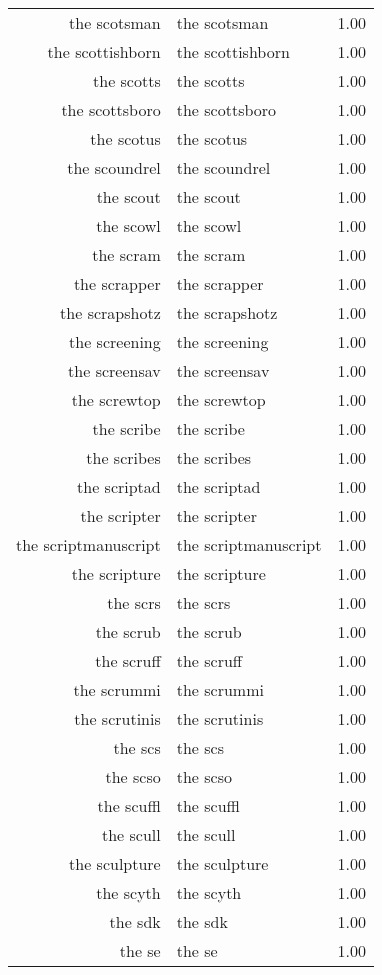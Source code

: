 \begin{table}[ht]
\begin{tabular}{rlr}
  the scotsman & the scotsman & 1.00 \\ 
  the scottishborn & the scottishborn & 1.00 \\ 
  the scotts & the scotts & 1.00 \\ 
  the scottsboro & the scottsboro & 1.00 \\ 
  the scotus & the scotus & 1.00 \\ 
  the scoundrel & the scoundrel & 1.00 \\ 
  the scout & the scout & 1.00 \\ 
  the scowl & the scowl & 1.00 \\ 
  the scram & the scram & 1.00 \\ 
  the scrapper & the scrapper & 1.00 \\ 
  the scrapshotz & the scrapshotz & 1.00 \\ 
  the screening & the screening & 1.00 \\ 
  the screensav & the screensav & 1.00 \\ 
  the screwtop & the screwtop & 1.00 \\ 
  the scribe & the scribe & 1.00 \\ 
  the scribes & the scribes & 1.00 \\ 
  the scriptad & the scriptad & 1.00 \\ 
  the scripter & the scripter & 1.00 \\ 
  the scriptmanuscript & the scriptmanuscript & 1.00 \\ 
  the scripture & the scripture & 1.00 \\ 
  the scrs & the scrs & 1.00 \\ 
  the scrub & the scrub & 1.00 \\ 
  the scruff & the scruff & 1.00 \\ 
  the scrummi & the scrummi & 1.00 \\ 
  the scrutinis & the scrutinis & 1.00 \\ 
  the scs & the scs & 1.00 \\ 
  the scso & the scso & 1.00 \\ 
  the scuffl & the scuffl & 1.00 \\ 
  the scull & the scull & 1.00 \\ 
  the sculpture & the sculpture & 1.00 \\ 
  the scyth & the scyth & 1.00 \\ 
  the sdk & the sdk & 1.00 \\ 
  the se & the se & 1.00 \\ 

\end{tabular}
\end{table}
